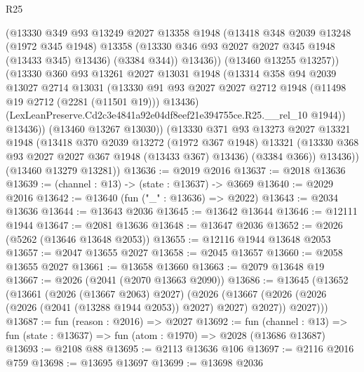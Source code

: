 \begin{lexlean}{R25}
\begin{coremodule}
                (@13330
                  @349
                  @93
                  @13249
                  @2027
                  @13358
                  @1948
                  (@13418
                    @348
                    @2039
                    @13248
                    (@1972 @345 @1948)
                    @13358
                    (@13330 @346 @93 @2027 @2027 @345 @1948 (@13433 @345) @13436)
                    (@3384 @344))
                  @13436))
              (@13460 @13255 @13257))
            (@13330
              @360
              @93
              @13261
              @2027
              @13031
              @1948
              (@13314
                @358
                @94
                @2039
                @13027
                @2714
                @13031
                (@13330
                  @91
                  @93
                  @2027
                  @2027
                  @2712
                  @1948
                  (@11498 @19 @2712 (@2281 (@11501 @19)))
                  @13436)
                (LexLeanPreserve.Cd2c3e4841a92e04df8eef21e394755ce.R25.__rel_10 @1944))
              @13436))
          (@13460 @13267 @13030))
        (@13330
          @371
          @93
          @13273
          @2027
          @13321
          @1948
          (@13418
            @370
            @2039
            @13272
            (@1972 @367 @1948)
            @13321
            (@13330 @368 @93 @2027 @2027 @367 @1948 (@13433 @367) @13436)
            (@3384 @366))
          @13436))
      (@13460 @13279 @13281))
@13636 := @2019 @2016
@13637 := @2018 @13636
@13639 := (channel : @13) -> (state : @13637) -> @3669
@13640 := @2029 @2016
@13642 := @13640 (fun ("_" : @13636) => @2022)
@13643 := @2034 @13636
@13644 := @13643 @2036
@13645 := @13642 @13644
@13646 := @12111 @1944
@13647 := @2081 @13636
@13648 := @13647 @2036
@13652 := @2026 (@5262 (@13646 @13648 @2053))
@13655 := @12116 @1944 @13648 @2053
@13657 := @2047 @13655 @2027
@13658 := @2045 @13657
@13660 := @2058 @13655 @2027
@13661 := @13658 @13660
@13663 := @2079 @13648 @19
@13667 := @2026 (@2041 (@2070 @13663 @2090))
@13686 := @13645
    (@13652
      (@13661
        (@2026 (@13667 @2063) @2027)
        (@2026
          (@13667 (@2026 (@2026 (@2026 (@2041 (@13288 @1944 @2053)) @2027) @2027) @2027))
          @2027)))
@13687 := fun (reason : @2016) => @2027
@13692 := fun (channel : @13) => fun (state : @13637) => fun (atom : @1970) => @2028 (@13686 @13687)
@13693 := @2108 @88
@13695 := @2113 @13636 @106
@13697 := @2116 @2016 @759
@13698 := @13695 @13697
@13699 := @13698 @2036

\end{coremodule}
\end{lexlean}

